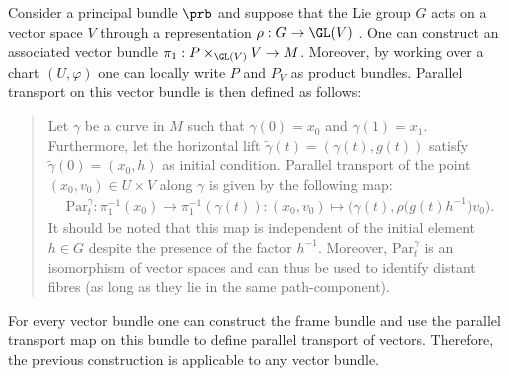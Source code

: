 
    \begin{example}
        Consider a principal bundle $\prb$ and suppose that the Lie group $G$ acts on a vector space $V$ through a representation $\rho:G\rightarrow\GL(V)$ . One can construct an associated vector bundle $\pi_1:P\times_{\GL(V)} V\rightarrow M$. Moreover, by working over a chart $(U,\varphi)$ one can locally write $P$ and $P_V$ as product bundles. Parallel transport on this vector bundle is then defined as follows:
        \begin{quote}
            Let $\gamma$ be a curve in $M$ such that $\gamma(0)=x_0$ and $\gamma(1)=x_1$. Furthermore, let the horizontal lift $\widetilde{\gamma}(t) = (\gamma(t),g(t))$ satisfy $\widetilde{\gamma}(0)=(x_0,h)$ as initial condition. Parallel transport of the point $(x_0,v_0)\in U\times V$ along $\gamma$ is given by the following map:
            \begin{gather}
                \mathrm{Par}^\gamma_t:\pi^{-1}_1(x_0)\rightarrow\pi^{-1}_1(\gamma(t)):(x_0, v_0)\mapsto\big(\gamma(t),\rho\big(g(t)h^{-1}\big)v_0\big).
            \end{gather}
            It should be noted that this map is independent of the initial element $h\in G$ despite the presence of the factor $h^{-1}$. Moreover, $\mathrm{Par}^\gamma_t$ is an isomorphism of vector spaces and can thus be used to identify distant fibres (as long as they lie in the same path-component).
        \end{quote}
    \end{example}
    \begin{remark}
        For every vector bundle one can construct the frame bundle and use the parallel transport map on this bundle to define parallel transport of vectors. Therefore, the previous construction is applicable to any vector bundle.
    \end{remark}

